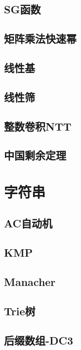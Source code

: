 \documentclass[a4paper]{article}
\begin{document}
\subsection{SG函数}

\subsection{矩阵乘法快速幂}

\subsection{线性基}

\subsection{线性筛}

\subsection{整数卷积NTT}

\subsection{中国剩余定理}

\section{字符串}
\subsection{AC自动机}

\subsection{KMP}

\subsection{Manacher}

\subsection{Trie树}

\subsection{后缀数组-DC3}

\end{document}
